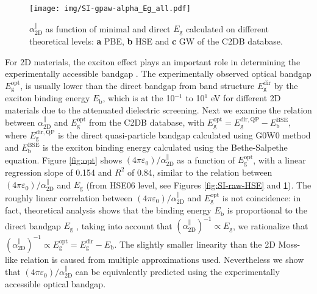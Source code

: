 \documentclass[manuscript=suppinfo,email=true,hyperref=true,keywords=false]{achemso}
\begin{document}
\begin{figure}[htbp]
  \centering
  \texttt{[image: img/SI-gpaw-alpha\_Eg\_all.pdf]}
  \caption{$\alpha_{\mathrm{2D}}^{\parallel}$ as function of minimal and direct
    $E_{\mathrm{g}}$ calculated on different theoretical levels:
    \textbf{a} PBE, \textbf{b} HSE and \textbf{c} GW of the C2DB
    database.}
  \label{fig:SI-gpaw-alpha-Eg-all}
\end{figure}

For 2D materials, the exciton effect plays an important role in
determining the experimentally accessible bandgap
\cite{Arnaud_2006_exc_hBN,Pulci_2014,Ramasubramaniam_2012,Chernikov_2014_EB_MoS2_2D3D}. The
experimentally observed optical bandgap
$E_{\mathrm{g}}^{\mathrm{opt}}$, is usually lower than the direct
bandgap from band structure $E_{\mathrm{g}}^{\mathrm{dir}}$ by the
exciton binding energy $E_{\mathrm{b}}$, which is at the 10$^{-1}$ to
10$^{1}$ eV for different 2D materials due to the attenuated
dielectric screening. Next we examine the relation between
$\alpha_{\mathrm{2D}}^{\parallel}$ and $E_{\mathrm{g}}^{\mathrm{opt}}$
from the C2DB database, with
$E_{\mathrm{g}}^{\mathrm{opt}}=E_{\mathrm{g}}^{\mathrm{dir,QP}}-E_{\mathrm{b}}^{\mathrm{BSE}}$,
where $E_{\mathrm{g}}^{\mathrm{dir,QP}}$ is the direct quasi-particle
bandgap calculated using G0W0 method and
$E_{\mathrm{b}}^{\mathrm{BSE}}$ is the exciton binding energy
calculated using the Bethe-Salpethe equation. Figure \ref{fig:opt}
shows $(4\pi\varepsilon_{0})/\alpha_{\mathrm{2D}}^{\parallel}$ as a
function of $E_{\mathrm{g}}^{\mathrm{opt}}$, with a linear regression
slope of 0.154 and $R^{2}$ of 0.84, similar to the relation between
$(4\pi \varepsilon_{0})/\alpha_{\mathrm{2D}}^{\parallel}$ and
$E_{\mathrm{g}}$ (from HSE06 level, see Figures \ref{fig:SI-raw-HSE}
and \ref{fig:SI-gpaw-alpha-Eg-all}). The roughly linear correlation
between $(4\pi \varepsilon_{0})/\alpha_{\mathrm{2D}}^{\parallel}$ and
$E_{\mathrm{g}}^{\mathrm{opt}}$ is not coincidence: in fact,
theoretical analysis shows that the binding energy $E_{\mathrm{b}}$ is
proportional to the direct bandgap $E_{\mathrm{g}}$
\cite{Jiang_2017_Eg_Eb}, taking into account that
$(\alpha_{\mathrm{2D}}^{\parallel})^{-1} \propto E_{\mathrm{g}}$, we
rationalize that
$(\alpha_{\mathrm{2D}}^{\parallel})^{-1} \propto
E_{\mathrm{g}}^{\mathrm{opt}}=E_{\mathrm{g}}^{\mathrm{dir}}-E_{\mathrm{b}}$. The
slightly smaller linearity than the 2D Moss-like relation is caused
from multiple approximations used. Nevertheless we show that
$(4\pi\varepsilon_{0})/\alpha_{\mathrm{2D}}^{\parallel}$ can be
equivalently predicted using the experimentally accessible optical
bandgap.
\end{document}
